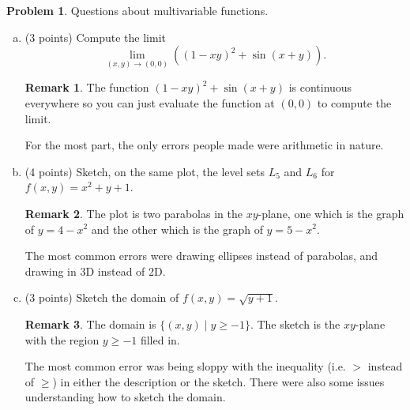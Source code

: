 \documentclass[11pt,oneside]{amsart}
\theoremstyle{definition}
\newtheorem{problem}{Problem}
\newtheorem*{remark}{Remark}
\theoremstyle{plain}
\begin{document}
\begin{problem}
  Questions about multivariable functions.
  \begin{enumerate}[(a)]
    \item (3 points) Compute the limit
    \[\lim_{(x,y)\to (0,0)}((1-xy)^2+\sin(x+y)).\]
    \begin{remark}\color{blue}
      The function $(1-xy)^2+\sin(x+y)$ is continuous everywhere so you can just evaluate the function at $(0,0)$ to compute the limit.

      For the most part, the only errors people made were arithmetic in nature.
    \end{remark}
    \vfill
    \item (4 points) Sketch, on the same plot, the level sets $L_5$ and $L_6$ for $f(x,y)=x^2+y+1$.
    \begin{remark}\color{blue}
      The plot is two parabolas in the $xy$-plane, one which is the graph of $y=4-x^2$ and the other which is the graph of $y=5-x^2$.

      The most common errors were drawing ellipses instead of parabolas, and drawing in 3D instead of 2D.
      \begin{center}
      \end{center}
    \end{remark}
    \vfill
    \vfill
    \item (3 points) Sketch the domain of $f(x,y)=\sqrt{y+1}$.
    \begin{remark}\color{blue}
      The domain is $\{(x,y)\mid y\geq -1\}$. The sketch is the $xy$-plane with the region $y\geq-1$ filled in.

      The most common error was being sloppy with the inequality (i.e. $>$ instead of $\geq$) in either the description or the sketch. There were also some issues understanding how to sketch the domain.
      \begin{center}
      \end{center}
   \end{remark}
    \vfill
  \end{enumerate}
\end{problem}
\end{document}
